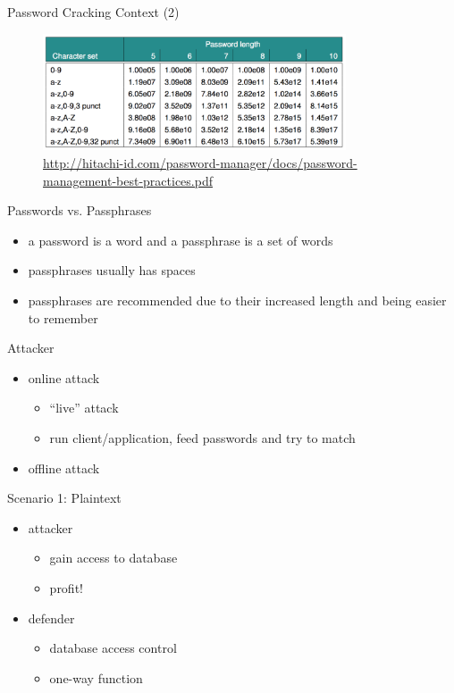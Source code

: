 \documentclass{curs}
\begin{document}
\begin{frame}{Password Cracking Context (2)}
  \begin{figure}
    \centering
    \includegraphics[width=0.8\textwidth]{img/password-complexity.png} \\
    \tiny{\url{http://hitachi-id.com/password-manager/docs/password-management-best-practices.pdf}}
  \end{figure}
\end{frame}

\begin{frame}{Passwords vs. Passphrases}
  \begin{itemize}
    \item a password is a word and a passphrase is a set of words
    \item passphrases usually has spaces
    \item passphrases are recommended due to their increased length and being easier to remember
  \end{itemize}
\end{frame}

\begin{frame}{Attacker}
  \begin{itemize}
    \item online attack
      \begin{itemize}
        \item ``live'' attack
        \item run client/application, feed passwords and try to match
      \end{itemize}
    \item offline attack
  \end{itemize}
\end{frame}

\begin{frame}{Scenario 1: Plaintext}
  \begin{itemize}
    \item attacker
      \begin{itemize}
        \item gain access to database
        \item profit!
      \end{itemize}
    \item defender
      \begin{itemize}
        \item database access control
        \item one-way function
      \end{itemize}
  \end{itemize}
\end{frame}
\end{document}
